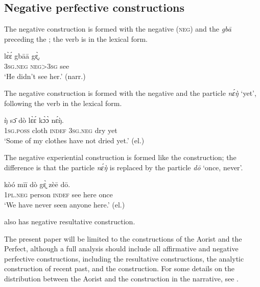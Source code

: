 \documentclass[output=paper]{LSP/langsci}
\begin{document}
\subsection{Negative perfective constructions}
\label{khachsecneg}
The negative  construction is formed with the negative  (\textsc{neg}) and the  \textit{gbā} preceding the ; the verb is in the lexical form.

\begin{exe} \ex
\gll lɛ̀ɛ́	gbāā	gɛ̰̀.\\
	3\textsc{sg}.\textsc{neg}	\textsc{neg}>3\textsc{sg}	see\\
\glt ‘He didn’t see her.’ (narr.)
\end{exe} 

The negative  construction is formed with the negative  and the particle \textit{nɛ́ŋ̀} ‘yet’, following the verb in the lexical form.

\begin{exe}\ex
\gll ŋ̀	sɔ̄	dò	lɛ̀ɛ́	kɔ̀ɔ̀	nɛ́ŋ̀.	\\
	1\textsc{sg}.\textsc{poss}	cloth	\textsc{indef}	3\textsc{sg}.\textsc{neg}	dry	yet	\\
\glt ‘Some of my clothes have not dried yet.’ (el.)
\end{exe}

The negative experiential construction is formed like the  construction; the difference is that the particle \textit{nɛ́ŋ̀} is replaced by the particle \textit{dō} ‘once, never’.

\begin{exe} \ex
\gll 	kòó	mīī	dò	gɛ̰̀	zèē	dō.	\\
	1\textsc{pl}.\textsc{neg}	person	\textsc{indef}	see	here	once	\\
\glt ‘We have never seen anyone here.’ (el.)
\end{exe}

 also has negative resultative construction.

The present paper will be limited to the constructions of the Aorist and the Perfect, although a full analysis should include all affirmative and negative perfective constructions, including the resultative constructions, the analytic construction of recent past, and the  construction. For some details on the distribution between the Aorist and the  construction in the narrative, see .
 
\end{document}
